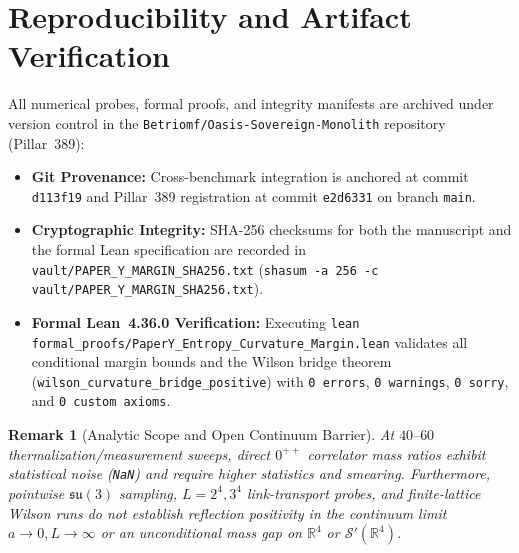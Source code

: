 \documentclass[11pt,a4paper]{article}
\newtheorem{remark}[theorem]{Remark}
\begin{document}
\section{Reproducibility and Artifact Verification}
All numerical probes, formal proofs, and integrity manifests are archived under version control in the \texttt{Betriomf/Oasis-Sovereign-Monolith} repository (Pillar~389):
\begin{itemize}
  \item \textbf{Git Provenance:} Cross-benchmark integration is anchored at commit \texttt{d113f19} and Pillar~389 registration at commit \texttt{e2d6331} on branch \texttt{main}.
  \item \textbf{Cryptographic Integrity:} SHA-256 checksums for both the manuscript and the formal Lean specification are recorded in \texttt{vault/PAPER\_Y\_MARGIN\_SHA256.txt} (\texttt{shasum -a 256 -c vault/PAPER\_Y\_MARGIN\_SHA256.txt}).
  \item \textbf{Formal Lean~4.36.0 Verification:} Executing \texttt{lean formal\_proofs/PaperY\_Entropy\_Curvature\_Margin.lean} validates all conditional margin bounds and the Wilson bridge theorem (\texttt{wilson\_curvature\_bridge\_positive}) with \texttt{0 errors}, \texttt{0 warnings}, \texttt{0 sorry}, and \texttt{0 custom axioms}.
\end{itemize}

\begin{remark}[Analytic Scope and Open Continuum Barrier]
At $40\text{--}60$ thermalization/measurement sweeps, direct $0^{++}$ correlator mass ratios exhibit statistical noise (\texttt{NaN}) and require higher statistics and smearing. Furthermore, pointwise $\mathfrak{su}(3)$ sampling, $L=2^4, 3^4$ link-transport probes, and finite-lattice Wilson runs do not establish reflection positivity in the continuum limit $a \to 0, L \to \infty$ or an unconditional mass gap on $\mathbb{R}^4$ or $\mathcal{S}'(\mathbb{R}^4)$.
\end{remark}
\end{document}
